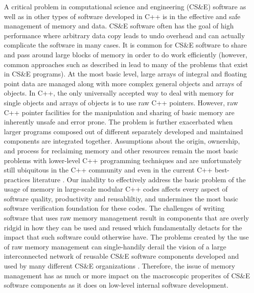 \documentclass[pdf,ps2pdf,11pt]{SANDreport}
\begin{document}
A critical problem in computational science and engineering (CS\&E)
software as well as in other types of software developed in C++ is in
the effective and safe management of memory and data.  CS\&E software
often has the goal of high performance where arbitrary data copy leads
to undo overhead and can actually complicate the software in many
cases.  It is common for CS\&E software to share and pass around large
blocks of memory in order to do work efficiently (however, common
approaches such as described in
{}\cite{DataSharinginScientificSimulations} lead to many of the
problems that exist in CS\&E programs).  At the most basic level,
large arrays of integral and floating point data are managed along
with more complex general objects and arrays of objects.  In C++, the
only universally accepted way to deal with memory for single objects
and arrays of objects is to use raw C++ pointers.  However, raw C++
pointer facilities for the manipulation and sharing of basic memory
are inherently unsafe and error prone.  The problem is further
exacerbated when larger programs composed out of different separately
developed and maintained components are integrated together.
Assumptions about the origin, ownership, and process for reclaiming
memory and other resources remain the most basic problems with
lower-level C++ programming techniques and are unfortunately still
ubiquitous in the C++ community and even in the current C++
best-practices literature {}\cite{C++CodingStandards05,
EffectiveC++ThirdEdition}.  Our inability to effectively address the
basic problem of the usage of memory in large-scale modular C++ codes
affects every aspect of software quality, productivity and
reusabliltiy, and undermines the most basic software verification
foundation for these codes.  The challenges of writing software that
uses raw memory management result in components that are overly ridgid
in how they can be used and reused which fundamentally detacts for the
impact that such software could otherwise have.  The problems created
by the use of raw memory management can single-handily derail the
vision of a large interconnected network of reusable CS\&E software
components developed and used by many different CS\&E organizations
{}\cite{HPCNeedsAToolsStrategy05}.  Therefore, the issue of memory
management has as much or more impact on the macroscopic properites of
CS\&E software components as it does on low-level internal software
development.
\end{document}
